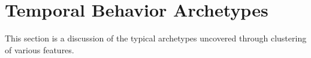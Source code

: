 \section{Temporal Behavior Archetypes}
\label{sec:archetypes}

This section is a discussion of the typical archetypes uncovered through clustering of various features.